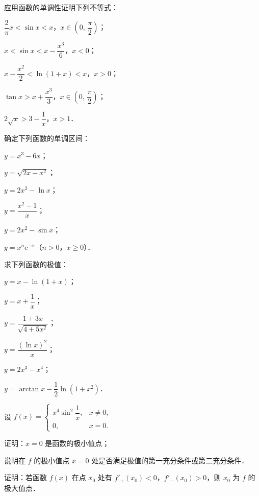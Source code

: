 \begin{xiti}
\item 应用函数的单调性证明下列不等式：
\begin{ziti}
\item $\dfrac{2}{\pi}x < \sin x < x$，$x \in \left(0,\, \dfrac{\pi}{2}\right)$；
\item $x < \sin x < x - \dfrac{x^3}{6}$，$x < 0$；
\item $x - \dfrac{x^2}{2} < \ln(1+x) < x$，$x > 0$；
\item $\tan x > x + \dfrac{x^3}{3}$，$x \in \left(0,\, \dfrac{\pi}{2}\right)$；
\item $2\sqrt{x} > 3 - \dfrac{1}{x}$，$x > 1$．
\end{ziti}
\item 确定下列函数的单调区间：
\begin{ziti}
\item $y = x^3 - 6x$；
\item $y = \sqrt{2x - x^2}$；
\item $y = 2x^2 - \ln x$；
\item $y = \dfrac{x^2-1}{x}$；
\item $y = 2x^2 - \sin x$；
\item $y = x^n \mathrm{e}^{-x}$（$n > 0$，$x \geqslant 0$）．
\end{ziti}
\item 求下列函数的极值：
\begin{ziti}
\item $y = x - \ln(1+x)$；
\item $y = x + \dfrac{1}{x}$；
\item $y = \dfrac{1+3x}{\sqrt{4+5x^2}}$；
\item $y = \dfrac{(\ln x)^2}{x}$；
\item $y = 2x^3 - x^4$；
\item $y = \arctan x - \dfrac{1}{2}\ln\left(1+x^2\right)$．
\end{ziti}
\item 设 $f(x) = \begin{cases} x^4 \sin^2\dfrac{1}{x}, & x \neq 0, \\ 0, & x = 0. \end{cases}$
\begin{ziti}
\item 证明：$x = 0$ 是函数的极小值点；
\item 说明在 $f$ 的极小值点 $x = 0$ 处是否满足极值的第一充分条件或第二充分条件．
\end{ziti}
\item 证明：若函数 $f(x)$ 在点 $x_0$ 处有 $f'_+(x_0) < 0$，$f'_-(x_0) > 0$，则 $x_0$ 为 $f$ 的极大值点．

\end{xiti}

